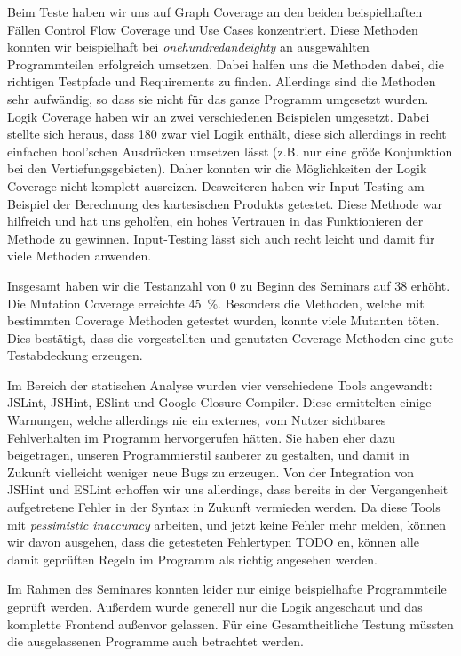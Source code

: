 \documentclass[ngerman]{article}
\begin{document}
Beim Teste haben wir uns auf Graph Coverage an den beiden beispielhaften Fällen Control Flow Coverage und Use Cases konzentriert.
Diese Methoden konnten wir beispielhaft bei \emph{onehundredandeighty} an ausgewählten Programmteilen erfolgreich umsetzen.
Dabei halfen uns die Methoden dabei, die richtigen Testpfade und Requirements zu finden.
Allerdings sind die Methoden sehr aufwändig, so dass sie nicht für das ganze Programm umgesetzt wurden.
Logik Coverage haben wir an zwei verschiedenen Beispielen umgesetzt.
Dabei stellte sich heraus, dass 180 zwar viel Logik enthält, diese sich allerdings in recht einfachen bool'schen Ausdrücken umsetzen lässt (z.B. nur eine größe Konjunktion bei den Vertiefungsgebieten).
Daher konnten wir die Möglichkeiten der Logik Coverage nicht komplett ausreizen.
Desweiteren haben wir Input-Testing am Beispiel der Berechnung des kartesischen Produkts getestet.
Diese Methode war hilfreich und hat uns geholfen, ein hohes Vertrauen in das Funktionieren der Methode zu gewinnen.
Input-Testing lässt sich auch recht leicht und damit für viele Methoden anwenden.

Insgesamt haben wir die Testanzahl von 0 zu Beginn des Seminars auf 38 erhöht.
Die Mutation Coverage erreichte 45~\%.
Besonders die Methoden, welche mit bestimmten Coverage Methoden getestet wurden, konnte viele Mutanten töten.
Dies bestätigt, dass die vorgestellten und genutzten Coverage-Methoden eine gute Testabdeckung erzeugen.

Im Bereich der statischen Analyse wurden vier verschiedene Tools angewandt: JSLint, JSHint, ESlint und Google Closure Compiler.
Diese ermittelten einige Warnungen, welche allerdings nie ein externes, vom Nutzer sichtbares Fehlverhalten im Programm hervorgerufen hätten.
Sie haben eher dazu beigetragen, unseren Programmierstil sauberer zu gestalten, und damit in Zukunft vielleicht weniger neue Bugs zu erzeugen.
Von der Integration von JSHint und ESLint erhoffen wir uns allerdings, dass bereits in der Vergangenheit aufgetretene Fehler in der Syntax in Zukunft vermieden werden.
Da diese Tools mit \emph{pessimistic inaccuracy} arbeiten, und jetzt keine Fehler mehr melden, können wir davon ausgehen, dass die getesteten Fehlertypen 
TODO
en, können alle damit geprüften Regeln im Programm als richtig angesehen werden.

Im Rahmen des Seminares konnten leider nur einige beispielhafte Programmteile geprüft werden. Außerdem wurde generell nur die Logik angeschaut und das komplette Frontend außenvor gelassen. Für eine Gesamtheitliche Testung müssten die ausgelassenen Programme auch betrachtet werden.
\end{document}
